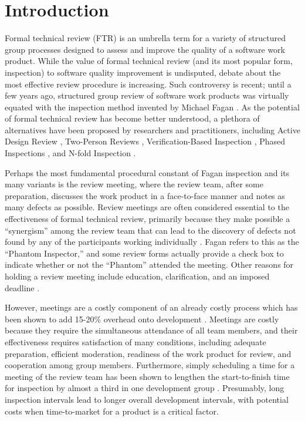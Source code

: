 \newpage


\section{Introduction}

Formal technical review (FTR) is an umbrella term for a variety of structured
group processes designed to assess and improve the quality of a software
work product.  While the value of formal technical review (and its most
popular form, inspection) to software quality improvement is undisputed,
debate about the most effective review procedure is increasing.  Such
controversy is recent; until a few years ago, structured group review of
software work products was virtually equated with the inspection method
invented by Michael Fagan \cite{Fagan76,Fagan86}.  As the potential of
formal technical review has become better understood, a plethora of
alternatives have been proposed by researchers and practitioners,
including Active Design Review \cite{Parnas87}, 
Two-Person Reviews \cite{Bisant89}, Verification-Based Inspection
\cite{Dyer92}, Phased Inspections \cite{Knight93}, and N-fold Inspection
\cite{Martin90}.

Perhaps the most fundamental procedural constant of Fagan inspection and
its many variants is the review meeting, where the review team, after some
preparation, discusses the work product in a face-to-face manner and notes
as many defects as possible.  Review meetings are often considered
essential to the effectiveness of formal technical review, primarily
because they make possible a ``synergism'' among the review team that can
lead to the discovery of defects not found by any of the participants working
individually \cite{Ackerman89,Weller93}.  Fagan refers to this as the ``Phantom Inspector,'' and some
review forms actually provide a check box to indicate whether or not the
``Phantom'' attended the meeting.  Other reasons for holding a review
meeting include education, clarification, and an imposed deadline
\cite{Gilb93,Strauss94}.

However, meetings are a costly component of an already costly
process which has been shown to add 15-20\% overhead onto development
\cite{Russell91}. Meetings are costly because they require the simultaneous
attendance of all team members, and their effectiveness requires
satisfaction of many conditions, including adequate preparation, efficient
moderation, readiness of the work product for review, and cooperation among
group members.  Furthermore, simply scheduling a time for a meeting of the
review team has been shown to lengthen the start-to-finish time for
inspection by almost a third in one development group \cite{Votta93}.
Presumably, long inspection intervals lead to longer overall development
intervals, with potential costs when time-to-market for a
product is a critical factor.

